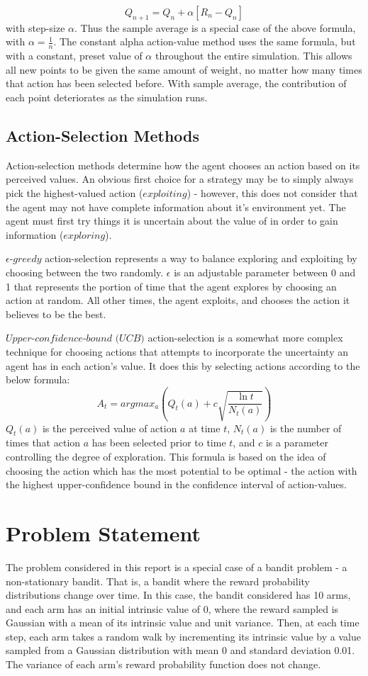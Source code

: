 \documentclass{article}
\begin{document}
$$Q_{n+1} = Q_n + \alpha[R_n - Q_n]$$
with step-size $\alpha$. Thus the sample average is a special case of the above formula, with $\alpha=\frac{1}{n}$. The constant alpha action-value method uses the same formula, but with a constant, preset value of $\alpha$ throughout the entire simulation. This allows all new points to be given the same amount of weight, no matter how many times that action has been selected before. With sample average, the contribution of each point deteriorates as the simulation runs.

\subsection{Action-Selection Methods}

Action-selection methods determine how the agent chooses an action based on its perceived values. An obvious first choice for a strategy may be to simply always pick the highest-valued action ($\textit{exploiting}$) - however, this does not consider that the agent may not have complete information about it's environment yet. The agent must first try things it is uncertain about the value of in order to gain information ($\textit{exploring}$).

${\epsilon}\textit{-greedy}$ action-selection represents a way to balance exploring and exploiting by choosing between the two randomly. $\epsilon$ is an adjustable parameter between 0 and 1 that represents the portion of time that the agent explores by choosing an action at random. All other times, the agent exploits, and chooses the action it believes to be the best.

$\textit{Upper-confidence-bound (UCB)}$ action-selection is a somewhat more complex technique for choosing actions that attempts to incorporate the uncertainty an agent has in each action's value. It does this by selecting actions according to the below formula:
$$A_t = argmax_a(Q_t(a) + c \sqrt{\frac{\ln{t}}{N_t(a)}})$$
$Q_t(a)$ is the perceived value of action $a$ at time $t$, $N_t(a)$ is the number of times that action $a$ has been selected prior to time $t$, and $c$ is a parameter controlling the degree of exploration. This formula is based on the idea of choosing the action which has the most potential to be optimal - the action with the highest upper-confidence bound in the confidence interval of action-values.
  
\section{Problem Statement}
The problem considered in this report is a special case of a bandit problem - a non-stationary bandit. That is, a bandit where the reward probability distributions change over time. In this case, the bandit considered has 10 arms, and each arm has an initial intrinsic value of 0, where the reward sampled is Gaussian with a mean of its intrinsic value and unit variance. Then, at each time step, each arm takes a random walk by incrementing its intrinsic value by a value sampled from a Gaussian distribution with mean 0 and standard deviation 0.01. The variance of each arm's reward probability function does not change.
\end{document}
